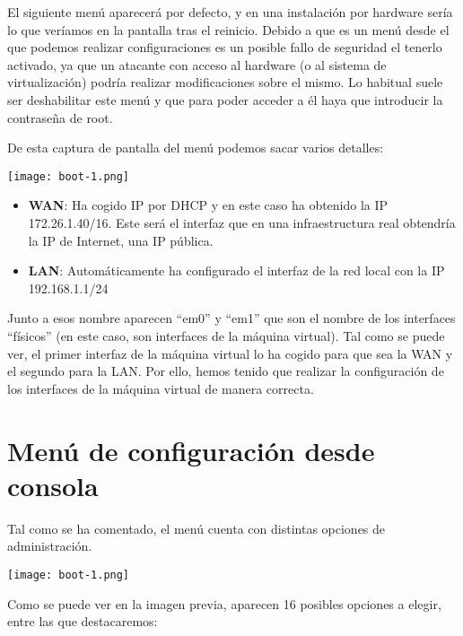 El siguiente menú aparecerá por defecto, y en una instalación por hardware sería lo que veríamos en la pantalla tras el reinicio. Debido a que es un menú desde el que podemos realizar configuraciones es un posible fallo de seguridad el tenerlo activado, ya que un atacante con acceso al hardware (o al sistema de virtualización) podría realizar modificaciones sobre el mismo. Lo habitual suele ser deshabilitar este menú y que para poder acceder a él haya que introducir la contraseña de root.

De esta captura de pantalla del menú podemos sacar varios detalles:

\begin{center}
    \vspace{-15pt}
    \texttt{[image: boot-1.png]}
    \vspace{-10pt}
\end{center}

\begin{itemize}
    \item \textbf{WAN}: Ha cogido IP por DHCP y en este caso ha obtenido la IP 172.26.1.40/16. Este será el interfaz que en una infraestructura real obtendría la IP de Internet, una IP pública.
    \item \textbf{LAN}: Automáticamente ha configurado el interfaz de la red local con la IP 192.168.1.1/24
\end{itemize}


Junto a esos nombre aparecen “em0” y “em1” que son el nombre de los interfaces “físicos” (en este caso, son interfaces de la máquina virtual). Tal como se puede ver, el primer interfaz de la máquina virtual lo ha cogido para que sea la WAN y el segundo para la LAN. Por ello, hemos tenido que realizar la configuración de los interfaces de la máquina virtual de manera correcta.


\section{Menú de configuración desde consola}
Tal como se ha comentado, el menú cuenta con distintas opciones de administración.

\begin{center}
    \vspace{-10pt}
    \texttt{[image: boot-1.png]}
    \vspace{-10pt}
\end{center}

Como se puede ver en la imagen previa, aparecen 16 posibles opciones a elegir, entre las que destacaremos:

